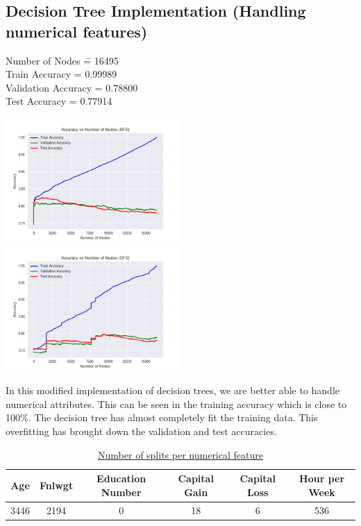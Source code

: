 \documentclass[12pt]{article}
\begin{document}
\subsection*{Decision Tree Implementation (Handling numerical features)}
\begin{addmargin}[0.3in]{0in}
\begin{tabbing}
Number of Nodes \qquad \= = 16495 \\
Train Accuracy \> = 0.99989 \\
Validation Accuracy \> = 0.78800 \\
Test Accuracy  \> = 0.77914 \\
\end{tabbing}
\end{addmargin}
\includegraphics[width=0.5\textwidth]{dtree4.png}
\includegraphics[width=0.5\textwidth]{dtree5.png}
\vspace{1mm}
\begin{addmargin}[0.3in]{0in}
In this modified implementation of decision trees, we are better able to handle numerical attributes. This can be seen in the training accuracy which is close to 100\%. The decision tree has almost completely fit the training data. This overfitting has brought down the validation and test accuracies.
\end{addmargin}
\vspace{2mm}
\begin{addmargin}[0.3in]{0in}
\begin{table}[h!]
\begin{center}
\caption{\underline{Number of splits per numerical feature}}
\vspace{1mm}
\label{tab:table1}
\begin{tabular}{|c|c|c|c|c|c|}
\hline
\textbf{Age} & \textbf{Fnlwgt} & \textbf{Education Number} & \textbf{Capital Gain} & \textbf{Capital Loss} & \textbf{Hour per Week} \\
\hline
3446 & 2194 & 0 & 18 & 6 & 536 \\
\hline
\end{tabular}
\end{center}
\end{table}
\end{addmargin}
\end{document}
